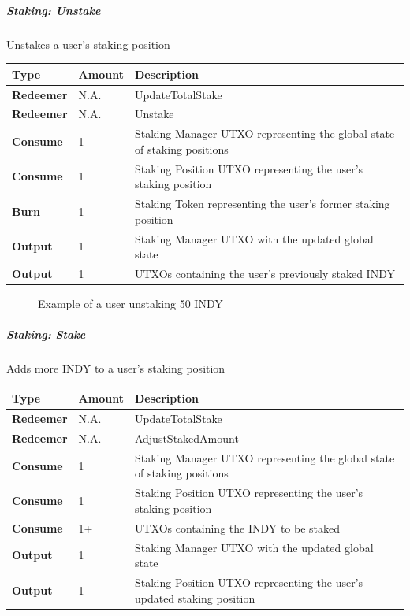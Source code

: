\documentclass{article}
\begin{document}
\begin{sloppypar}
\hypertarget{staking-unstake}{%
\subparagraph{Staking: Unstake}\label{staking-unstake}}

Unstakes a user's staking position

\begin{tabularx}{\linewidth}{l|l|L}
\toprule
\textbf{Type} & \textbf{Amount} & \textbf{Description}
\tabularnewline
\midrule
\endhead
\textbf{Redeemer} & N.A. & UpdateTotalStake
\tabularnewline
\midrule
\textbf{Redeemer} & N.A. & Unstake
\tabularnewline
\midrule
\textbf{Consume} & 1 & Staking Manager UTXO representing the global
state of staking positions
\tabularnewline
\midrule
\textbf{Consume} & 1 & Staking Position UTXO representing the user's
staking position
\tabularnewline
\midrule
\textbf{Burn} & 1 & Staking Token representing the user's former staking
position
\tabularnewline
\midrule
\textbf{Output} & 1 & Staking Manager UTXO with the updated global
state
\tabularnewline
\midrule
\textbf{Output} & 1 & UTXOs containing the user's previously staked
INDY
\tabularnewline
\bottomrule
\end{tabularx}

\hypertarget{staking-unstake-figure}{%
\begin{figure}[htbp]
\centering

\caption{Example of a user unstaking 50 INDY}
\label{staking-unstake-figure}
\end{figure}}

\hypertarget{staking-stake}{%
\subparagraph{Staking: Stake}\label{staking-stake}}

Adds more INDY to a user's staking position

\begin{tabularx}{\linewidth}{l|l|L}
\toprule
\textbf{Type} & \textbf{Amount} & \textbf{Description}
\tabularnewline
\midrule
\endhead
\textbf{Redeemer} & N.A. & UpdateTotalStake
\tabularnewline
\midrule
\textbf{Redeemer} & N.A. & AdjustStakedAmount
\tabularnewline
\midrule
\textbf{Consume} & 1 & Staking Manager UTXO representing the global
state of staking positions
\tabularnewline
\midrule
\textbf{Consume} & 1 & Staking Position UTXO representing the user's
staking position
\tabularnewline
\midrule
\textbf{Consume} & 1+ & UTXOs containing the INDY to be
staked
\tabularnewline
\midrule
\textbf{Output} & 1 & Staking Manager UTXO with the updated global
state
\tabularnewline
\midrule
\textbf{Output} & 1 & Staking Position UTXO representing the user's
updated staking position
\tabularnewline
\bottomrule
\end{tabularx}


\end{sloppypar}
\end{document}
